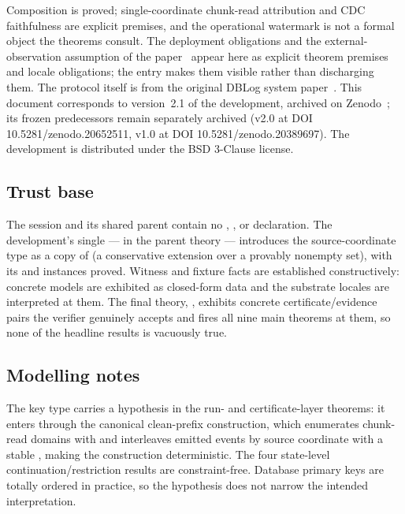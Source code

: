 \documentclass[11pt,a4paper]{article}
\begin{document}
Composition is proved; single-coordinate chunk-read attribution and
CDC faithfulness are explicit premises, and the operational watermark
is not a formal object the theorems consult. The deployment
obligations and the external-observation assumption of the
paper~\cite{andreakis2026theoretical} appear here as explicit theorem
premises and locale obligations; the entry makes them visible rather
than discharging them. The protocol itself is from the original DBLog
system paper~\cite{andreakis2020dblog}. This document corresponds to
version~2.1 of the development, archived on
Zenodo~\cite{andreakis2026artifact}; its frozen predecessors remain
separately archived (v2.0 at DOI 10.5281/zenodo.20652511, v1.0 at DOI
10.5281/zenodo.20389697). The
development is distributed under the BSD 3-Clause license.

\subsection*{Trust base}

The session and its shared
parent contain no , , or
 declaration. The development's single  ---
in the parent theory  ---
introduces the source-coordinate type as a copy of  (a
conservative extension over a provably nonempty set), with its
 and
 instances proved. Witness and
fixture facts are established constructively: concrete models are
exhibited as closed-form data and the substrate locales are
interpreted at them. The final theory,
,
exhibits concrete certificate/evidence pairs the verifier genuinely
accepts and fires all nine main theorems at them, so none of the
headline results is vacuously true.

\subsection*{Modelling notes}

The key type  carries a 
hypothesis in the run- and certificate-layer theorems: it enters
through the canonical clean-prefix construction, which enumerates
chunk-read domains with
and interleaves emitted events by source coordinate with a stable
, making the construction
deterministic. The four state-level continuation/restriction results
are constraint-free. Database primary keys are totally ordered in
practice, so the hypothesis does not narrow the intended
interpretation.
\end{document}

